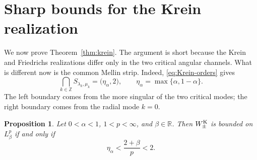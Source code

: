 \documentclass[11pt,a4paper,reqno,backref=page]{amsart}
\newcommand{\R}{\mathbb R}
\newcommand{\Z}{\mathbb Z}
\numberwithin{equation}{section}
\newtheorem{proposition}[theorem]{Proposition}
\theoremstyle{definition}
\theoremstyle{remark}
\begin{document}
\section{Sharp bounds for the Krein realization}
\label{sec:Krein}

We now prove Theorem~\ref{thm:krein}. The argument is short
because the Krein and Friedrichs realizations differ only in the
two critical angular channels. What is different now is the
common Mellin strip. Indeed, \eqref{eq:Krein-orders} gives
\begin{equation}\label{eq:Krein-common-strip}
  \bigcap_{k\in\Z}S_{\lambda_k,\mu_k}
  =\bigl(\eta_\alpha,2\bigr),
  \qquad \eta_\alpha=\max\{\alpha,1-\alpha\}.
\end{equation}
The left boundary comes from the more singular of the two
critical modes; the right boundary comes from the radial mode
$k=0$.

\begin{proposition}\label{prop:Krein-weighted}
Let $0<\alpha<1$, $1<p<\infty$, and $\beta\in\R$. Then
$W_\pm^{\rm K}$ is bounded on $L^p_\beta$ if and only if
\begin{equation}\label{eq:Krein-c-range}
  \eta_\alpha<\frac{2+\beta}{p}<2.
\end{equation}
\end{proposition}
\end{document}
